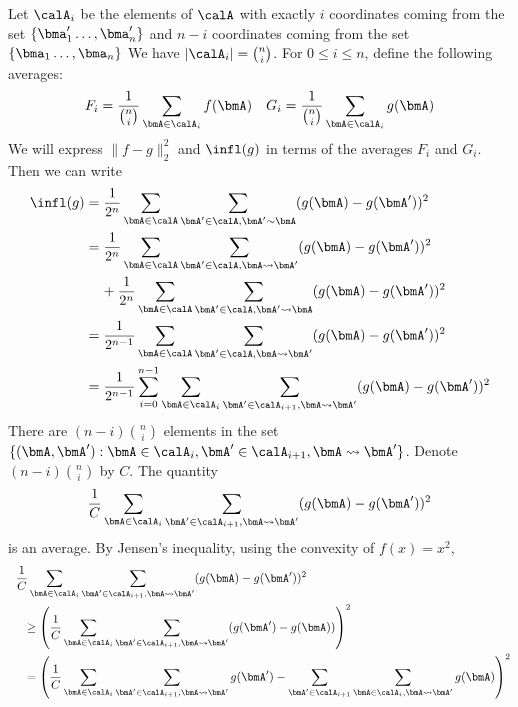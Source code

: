 Let $\calA_i$ be the elements of $\calA$ with exactly $i$ coordinates coming from the set 
$\{\bma_1' \ldots, \bma_n'\}$ 
and $n-i$ coordinates coming from the set 
$\{\bma_1 \ldots, \bma_n\}$
We have $|\calA_i| = \binom{n}{i}$. For $0 \leq i \leq n$, define the following averages:
\begin{align*}
    F_i = \frac{1}{\binom{n}{i}} \sum_{\bmA \in \calA_i} f(\bmA) & & 
    G_i = \frac{1}{\binom{n}{i}} \sum_{\bmA \in \calA_i} g(\bmA)
\end{align*}
We will express $\|f-g\|_2^2$ and $\infl(g)$ in terms of the averages $F_i$ and $G_i$. 
Then we can write
\begin{align}
    \infl(g) &= \frac{1}{2^n} \sum_{\bmA \in \calA} \sum_{\bmA' \in \calA, \bmA' \sim \bmA} (g(\bmA) - g(\bmA'))^2 \nonumber \\
    &= \frac{1}{2^n} \sum_{\bmA \in \calA} \sum_{\bmA' \in \calA, \bmA \leadsto
    \bmA'} (g(\bmA) - g(\bmA'))^2 \nonumber \\
    &\hspace{4mm} + \frac{1}{2^n} \sum_{\bmA \in \calA} \sum_{\bmA' \in \calA,
    \bmA' \leadsto \bmA} (g(\bmA) - g(\bmA'))^2 \nonumber \\
    &= \frac{1}{2^{n-1}} \sum_{\bmA \in \calA} \sum_{\bmA' \in \calA, \bmA \leadsto \bmA'} (g(\bmA) - g(\bmA'))^2  \nonumber \\
    &= \frac{1}{2^{n-1}} \sum_{i=0}^{n-1} \sum_{\bmA \in \calA_i} \sum_{\bmA' \in \calA_{i+1}, \bmA \leadsto \bmA'} (g(\bmA) - g(\bmA'))^2 \label{chap1-eq:infl-rep}
\end{align}
There are $(n-i)\binom{n}{i}$ elements in the set $\{(\bmA,\bmA') : \bmA \in \calA_i, \bmA' \in \calA_{i+1}, \bmA \leadsto \bmA'\}$. Denote $(n-i)\binom{n}{i}$ by $C$. 
The quantity
\begin{equation}\label{chap1-eq:infl-piece}
\frac{1}{C} \sum_{\bmA \in \calA_i} \sum_{\bmA' \in \calA_{i+1}, \bmA \leadsto \bmA'} (g(\bmA) - g(\bmA'))^2
\end{equation}
is an average. By Jensen's inequality, using the convexity of $f(x) = x^2$,
\begin{align}
    &\:~\frac{1}{C} \sum_{\bmA \in \calA_i} \sum_{\bmA' \in \calA_{i+1}, \bmA
    \leadsto \bmA'} (g(\bmA) - g(\bmA'))^2 \\
    &\:\hspace{1em}\geq \left( \frac{1}{C} \sum_{\bmA \in \calA_i} \sum_{\bmA'
  \in \calA_{i+1}, \bmA \leadsto \bmA'} (g(\bmA') - g(\bmA)) \right)^2 \nonumber \\
    &\:\hspace{1em} = \left( \frac{1}{C} \sum_{\bmA \in \calA_i} \sum_{\bmA' \in \calA_{i+1}, \bmA \leadsto \bmA'} g(\bmA') - \sum_{\bmA' \in \calA_{i+1}} \sum_{\bmA \in \calA_{i}, \bmA \leadsto \bmA'} g(\bmA) \right)^2 \label{chap1-eq:infl-jensen}
\end{align}
